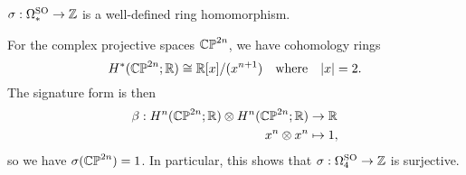 \documentclass{article}
\begin{document}
\begin{theorem}
  $\sigma : \Omega^{\mathrm{SO}}_* \to \mathbb{Z}$ is a well-defined ring homomorphism.
\end{theorem}

For the complex projective spaces $\mathbb{CP}^{2n}$, we have cohomology rings
\[
    H^*(\mathbb{CP}^{2n}; \mathbb{R}) \cong \mathbb{R}[x]/(x^{n+1})\quad\textrm{where}\quad |x|=2.
\]
The signature form is then
\[
  \begin{aligned}
    \beta : H^n(\mathbb{CP}^{2n}; \mathbb{R})\otimes H^n(\mathbb{CP}^{2n}; \mathbb{R}) &\to \mathbb{R}\\
    x^n\otimes x^n &\mapsto 1,
  \end{aligned}
\]
so we have $\sigma(\mathbb{CP}^{2n})=1$. In particular, this shows that
$
    \sigma : \Omega^{\mathrm{SO}}_4 \to \mathbb{Z}
$
is surjective.
\end{document}
